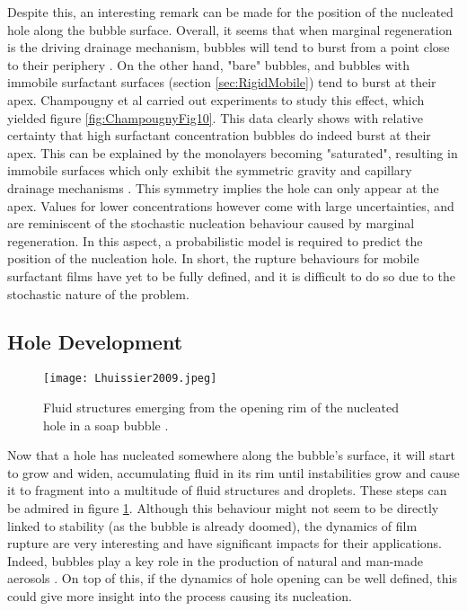 \documentclass[a4paper,12pt]{article}
\numberwithin{equation}{section}
\numberwithin{figure}{section}
\numberwithin{table}{section}
\begin{document}
Despite this, an interesting remark can be made for the position of the nucleated hole along the bubble surface. Overall, it seems that when marginal regeneration is the driving drainage mechanism, bubbles will tend to burst from a point close to their periphery \cite{Bhamla2017, Lhuissier2011}. On the other hand, "bare" bubbles, and bubbles with immobile surfactant surfaces (section \ref{sec:RigidMobile}) tend to burst at their apex. Champougny et al \cite{ChampougnyNotBare2016} carried out experiments to study this effect, which yielded figure \ref{fig:ChampougnyFig10}. This data clearly shows with relative certainty that high surfactant concentration bubbles do indeed burst at their apex. This can be explained by the monolayers becoming "saturated", resulting in immobile surfaces which only exhibit the symmetric gravity and capillary drainage mechanisms \cite{Bhamla2017}. This symmetry implies the hole can only appear at the apex. Values for lower concentrations however come with large uncertainties, and are reminiscent of the stochastic nucleation behaviour caused by marginal regeneration. In this aspect, a probabilistic model is required to predict the position of the nucleation hole. In short, the rupture behaviours for mobile surfactant films have yet to be fully defined, and it is difficult to do so due to the stochastic nature of the problem.

\subsection{Hole Development}

\begin{figure}[!htbp]
    \centering
    \captionsetup{width=.9\linewidth}
    \texttt{[image: Lhuissier2009.jpeg]}
    \caption{Fluid structures emerging from the opening rim of the nucleated hole in a soap bubble \cite{Lhuissier2009}.}
    \label{fig:Lhuissier2009}
\end{figure}

Now that a hole has nucleated somewhere along the bubble's surface, it will start to grow and widen, accumulating fluid in its rim until instabilities grow and cause it to fragment into a multitude of fluid structures and droplets. These steps can be admired in figure \ref{fig:Lhuissier2009}. Although this behaviour might not seem to be directly linked to stability (as the bubble is already doomed), the dynamics of film rupture are very interesting and have significant impacts for their applications. Indeed, bubbles play a key role in the production of natural and man-made aerosols \cite{Lhuissier2011, Modini2013}. On top of this, if the dynamics of hole opening can be well defined, this could give more insight into the process causing its nucleation.
\end{document}
